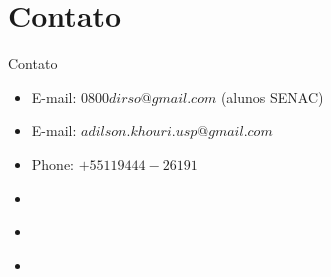 \section{Contato}

\begin{frame}	
	\begin{block}{Contato}	
		\begin{itemize}
			\item E-mail:  $0800dirso@gmail.com$ (alunos SENAC)			
			\item E-mail:  $adilson.khouri.usp@gmail.com$
			\item Phone: $+55 11 9444-26191$
			\item \href{https://www.linkedin.com/in/adilson-khouri-51893918/}{\color{blue}{Linkedin}}
			\item \href{http://lattes.cnpq.br/2654721135214993}{\color{blue}{Lattes}}
			\item \href{https://github.com/khouri/Apresentacao_Cusco}{\color{blue}{GitHub}}
		\end{itemize}
	\end{block}
\end{frame}

